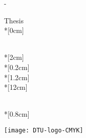 \thispagestyle{empty}             %
\calccentering{\unitlength}
\begin{adjustwidth*}{\unitlength}{-\unitlength}
    \begin{adjustwidth}{-0.5cm}{-0.5cm}
        \sffamily
        \begin{flushright}
            \thesistypeabbr{} Thesis\\*[0cm]
            \thesistype{}\\
        \end{flushright}
        \noindent
        \\*[2cm]
        \LARGE \thesistitle{}\\*[0.2cm]
        \large \thesissubtitle{}\\*[1.2cm]
        \\*[12cm]
        \parbox[b]{0.5\linewidth}{%
            \LARGE 
            \thesisauthor{}\\*[0.8cm]
            \large
            \thesislocation{} \the\year
        }
        \hfill\texttt{[image: DTU-logo-CMYK]}
    \end{adjustwidth}
\end{adjustwidth*}
\normalfont
\normalsize
